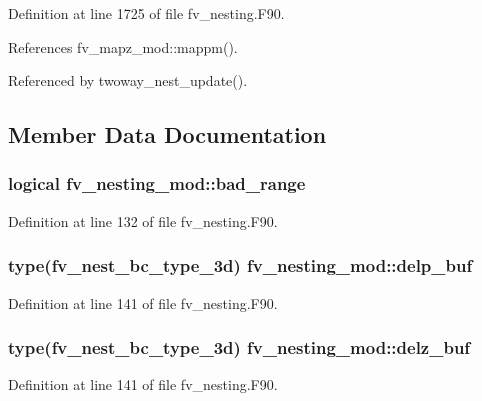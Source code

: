 Definition at line 1725 of file fv\-\_\-nesting.\-F90.



References fv\-\_\-mapz\-\_\-mod\-::mappm().



Referenced by twoway\-\_\-nest\-\_\-update().



\subsection{Member Data Documentation}
\subsubsection[{bad\-\_\-range}]{\setlength{\rightskip}{0pt plus 5cm}logical fv\-\_\-nesting\-\_\-mod\-::bad\-\_\-range}\label{classfv__nesting__mod_a6b3b4dfb2f4f57efd0b8ff7ba401b9bc}


Definition at line 132 of file fv\-\_\-nesting.\-F90.

\subsubsection[{delp\-\_\-buf}]{\setlength{\rightskip}{0pt plus 5cm}type(fv\-\_\-nest\-\_\-bc\-\_\-type\-\_\-3d) fv\-\_\-nesting\-\_\-mod\-::delp\-\_\-buf}\label{classfv__nesting__mod_a307ae066e30400f6e6d9839b04193cf3}


Definition at line 141 of file fv\-\_\-nesting.\-F90.

\subsubsection[{delz\-\_\-buf}]{\setlength{\rightskip}{0pt plus 5cm}type(fv\-\_\-nest\-\_\-bc\-\_\-type\-\_\-3d) fv\-\_\-nesting\-\_\-mod\-::delz\-\_\-buf}\label{classfv__nesting__mod_a3c14974429affc9b0ccdbb8e38813e72}


Definition at line 141 of file fv\-\_\-nesting.\-F90.

